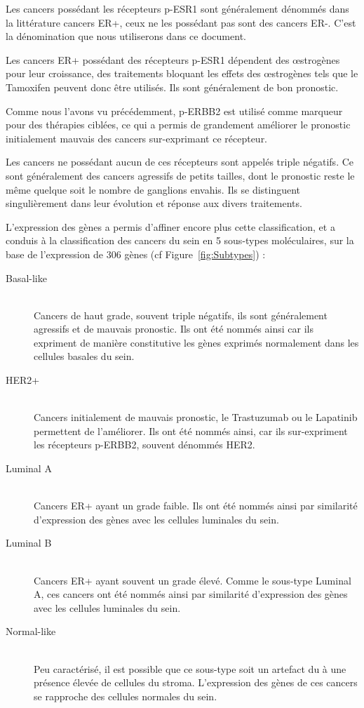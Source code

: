 			Les cancers possédant les récepteurs \acs{p-ESR1} sont généralement dénommés dans la littérature cancers \acs{ER+}, ceux ne les possédant pas sont des cancers \acs{ER-}.
			C'est la dénomination que nous utiliserons dans ce document.

			Les cancers \acs{ER+} possédant des récepteurs \acs{p-ESR1} dépendent des {\oe}strogènes pour leur croissance, des traitements bloquant les effets des {\oe}strogènes tels que le Tamoxifen peuvent donc être utilisés.
			Ils sont généralement de bon pronostic.

			Comme nous l'avons vu précédemment, \acs{p-ERBB2} est utilisé comme marqueur pour des thérapies ciblées, ce qui a permis de grandement améliorer le pronostic initialement mauvais des cancers sur-exprimant ce récepteur.

			Les cancers ne possédant aucun de ces récepteurs sont appelés triple négatifs.
			Ce sont généralement des cancers agressifs de petits tailles, dont le pronostic reste le même quelque soit le nombre de ganglions envahis.
			Ils se distinguent singulièrement dans leur évolution et réponse aux divers traitements.

			L'expression des gènes a permis d'affiner encore plus cette classification, et a conduis à la classification des cancers du sein en 5 sous-types moléculaires, sur la base de l'expression de 306 gènes \citep{Perou2000,Sorlie2001} (cf Figure~\ref{fig:Subtypes}) :
			\begin{description}
			\item [Basal-like]  \hfill \\
				Cancers de haut grade, souvent triple négatifs, ils sont généralement agressifs et de mauvais pronostic.
				Ils ont été nommés ainsi car ils expriment de manière constitutive les gènes exprimés normalement dans les cellules basales du sein.
			\item [\acs{HER2+}] \hfill \\
				Cancers initialement de mauvais pronostic, le Trastuzumab ou le Lapatinib permettent de l'améliorer.
				Ils ont été nommés ainsi, car ils sur-expriment les récepteurs \acs{p-ERBB2}, souvent dénommés \acs{HER2}.
			\item [Luminal A]   \hfill \\
				Cancers \acs{ER+} ayant un grade faible.
				Ils ont été nommés ainsi par similarité d'expression des gènes avec les cellules luminales du sein.
			\item [Luminal B]   \hfill \\
				Cancers \acs{ER+} ayant souvent un grade élevé.
				Comme le sous-type Luminal A, ces cancers ont été nommés ainsi par similarité d'expression des gènes avec les cellules luminales du sein.
			\item [Normal-like] \hfill \\
				Peu caractérisé, il est possible que ce sous-type soit un artefact du à une présence élevée de cellules du stroma.
				L'expression des gènes de ces cancers se rapproche des cellules normales du sein.
			\end{description}

